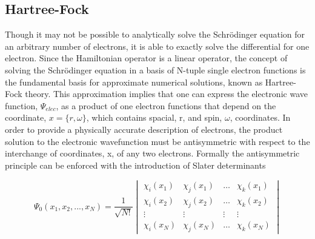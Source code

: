
  \subsection{Hartree-Fock}
    Though it may not be possible to analytically solve the Schr{\"o}dinger equation for an arbitrary number of electrons, it is able to exactly solve the differential for one electron.  Since the Hamiltonian operator is a linear operator, the concept of solving the Schr{\"o}dinger equation in a basis of N-tuple single electron functions is the fundamental basis for approximate numerical solutions, known as Hartree-Fock theory. \cite{Hartree 1928, Fock 1930, Szabo 1996, Sherril 2000} This approximation implies that one can express the electronic wave function, $\Psi_{elec}$, as a product of one electron functions that depend on the coordinate, $x = \{r, \omega\}$, which contains spacial, r, and spin, $\omega$, coordinates. In order to provide a physically accurate description of electrons, the product solution to the electronic wavefunction must be antisymmetric with respect to the interchange of coordinates, x, of any two electrons.  Formally the antisymmetric principle can be enforced with the introduction of Slater determinants\cite{Slater 1929, Slater 1930} 

    \begin{equation}
    \Psi_{0}(x_1, x_2, ..., x_N) = \frac{1}{\sqrt{N!}}
    \begin{vmatrix}
     \chi_i(x_1) &\chi_j(x_1) &\ldots   &\chi_k(x_1)   \\
     \chi_i(x_2) &\chi_j(x_2)  &\ldots & \chi_k(x_2)   \\
     \vdots&\vdots   &\vdots &\vdots   \\
     \chi_i(x_N) &\chi_j(x_N) & \ldots & \chi_k(x_N)
    \end{vmatrix}
    \end{equation}

